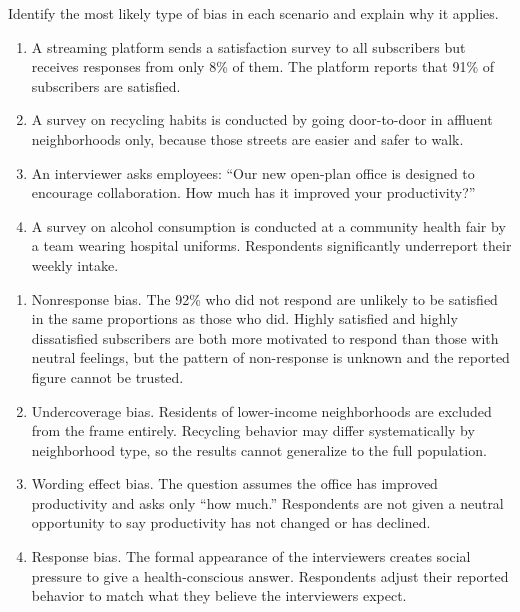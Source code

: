 \begin{Exercise}[title={Diagnosing Bias}, label={ex:bias-types}]
Identify the most likely type of bias in each scenario and explain why it applies.

\begin{enumerate} 
    \item A streaming platform sends a satisfaction survey to all subscribers but receives responses from only 8\% of them. 
    The platform reports that 91\% of subscribers are satisfied.

    \item A survey on recycling habits is conducted by going door-to-door in affluent neighborhoods only, because those streets 
    are easier and safer to walk.

    \item An interviewer asks employees: ``Our new open-plan office is designed to encourage collaboration. How much has it 
    improved your productivity?''

    \item A survey on alcohol consumption is conducted at a community health fair by a team wearing hospital uniforms. 
    Respondents significantly underreport their weekly intake.
\end{enumerate}
\end{Exercise}
\begin{Answer}[ref={ex:bias-types}]
\begin{enumerate} 
    \item Nonresponse bias. The 92\% who did not respond are unlikely to be satisfied in the same proportions as those who did. Highly satisfied and highly dissatisfied subscribers are both more motivated to respond than those with neutral feelings, but the pattern of non-response is unknown and the reported figure cannot be trusted.
    \item Undercoverage bias. Residents of lower-income neighborhoods are excluded from the frame entirely. Recycling behavior may differ systematically by neighborhood type, so the results cannot generalize to the full population.
    \item Wording effect bias. The question assumes the office has improved productivity and asks only ``how much.'' Respondents are not given a neutral opportunity to say productivity has not changed or has declined.
    \item Response bias. The formal appearance of the interviewers creates social pressure to give a health-conscious answer. Respondents adjust their reported behavior to match what they believe the interviewers expect.
\end{enumerate}
\end{Answer}


